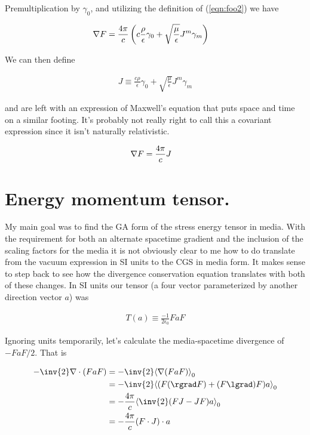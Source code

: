 Premultiplication by $\gamma_0$, and utilizing the definition of (\ref{eqn:foo2}) we have

\begin{align}\label{eqn:foo8}
\nabla F &= \frac{4 \pi}{c} \left( c \frac{\rho}{\epsilon} \gamma_0 + \sqrt{\frac{\mu}{\epsilon}} J^m \gamma_m \right)
\end{align}

We can then define

\begin{align}\label{eqn:foo9}
J \equiv \frac{c \rho}{\epsilon} \gamma_0 + \sqrt{\frac{\mu}{\epsilon}} J^m \gamma_m
\end{align}

and are left with an expression of Maxwell's equation that puts space and time on a similar footing.  It's probably not really right to call this a covariant expression since it isn't naturally relativistic.

\begin{align}\label{eqn:foo10}
\nabla F &= \frac{4 \pi}{c} J
\end{align}

\section{Energy momentum tensor.}

My main goal was to find the GA form of the stress energy tensor in media.  With the requirement for both an alternate spacetime gradient and the inclusion of the scaling factors for the media it is not obviously clear to me how to do translate from the vacuum expression in SI units to the CGS in media form.  It makes sense to step back to see how the divergence conservation equation translates with both of these changes.  In SI units our tensor (a four vector parameterized by another direction vector $a$) was

\begin{align}\label{eqn:foo11}
T(a) \equiv \frac{-1}{2\epsilon_0} F a F
\end{align}

Ignoring units temporarily, let's calculate the media-spacetime divergence of $-FaF/2$.  That is

\begin{align*}
-\inv{2} \grad \cdot (FaF)
&=
-\inv{2} \gpgradezero{\grad (FaF)} \\
&=
-\inv{2} \gpgradezero{(F(\rgrad F) + (F\lgrad)F) a} \\
&=
-\frac{4\pi}{c} \gpgradezero{\inv{2}(F J - J F) a} \\
&=
-\frac{4\pi}{c} (F \cdot J) \cdot a \\
\end{align*}

